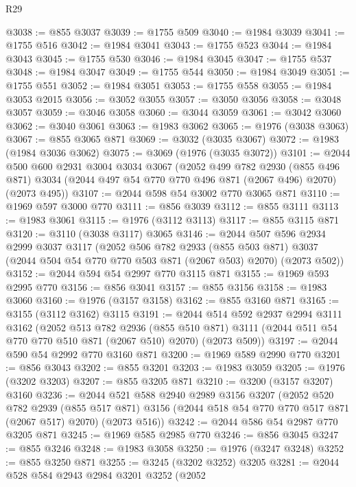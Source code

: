 \begin{lexlean}{R29}
\begin{coremodule}
@3038 := @855 @3037
@3039 := @1755 @509
@3040 := @1984 @3039
@3041 := @1755 @516
@3042 := @1984 @3041
@3043 := @1755 @523
@3044 := @1984 @3043
@3045 := @1755 @530
@3046 := @1984 @3045
@3047 := @1755 @537
@3048 := @1984 @3047
@3049 := @1755 @544
@3050 := @1984 @3049
@3051 := @1755 @551
@3052 := @1984 @3051
@3053 := @1755 @558
@3055 := @1984 @3053 @2015
@3056 := @3052 @3055
@3057 := @3050 @3056
@3058 := @3048 @3057
@3059 := @3046 @3058
@3060 := @3044 @3059
@3061 := @3042 @3060
@3062 := @3040 @3061
@3063 := @1983 @3062
@3065 := @1976 (@3038 @3063)
@3067 := @855 @3065 @871
@3069 := @3032 (@3035 @3067)
@3072 := @1983 (@1984 @3036 @3062)
@3075 := @3069 (@1976 (@3035 @3072))
@3101 := @2044
    @500
    @600
    @2931
    @3004
    @3034
    @3067
    (@2052
      @499
      @782
      @2930
      (@855 @496 @871)
      @3034
      (@2044 @497 @54 @770 @770 @496 @871 (@2067 @496) @2070)
      (@2073 @495))
@3107 := @2044 @598 @54 @3002 @770 @3065 @871
@3110 := @1969 @597 @3000 @770
@3111 := @856 @3039
@3112 := @855 @3111
@3113 := @1983 @3061
@3115 := @1976 (@3112 @3113)
@3117 := @855 @3115 @871
@3120 := @3110 (@3038 @3117) @3065
@3146 := @2044
    @507
    @596
    @2934
    @2999
    @3037
    @3117
    (@2052
      @506
      @782
      @2933
      (@855 @503 @871)
      @3037
      (@2044 @504 @54 @770 @770 @503 @871 (@2067 @503) @2070)
      (@2073 @502))
@3152 := @2044 @594 @54 @2997 @770 @3115 @871
@3155 := @1969 @593 @2995 @770
@3156 := @856 @3041
@3157 := @855 @3156
@3158 := @1983 @3060
@3160 := @1976 (@3157 @3158)
@3162 := @855 @3160 @871
@3165 := @3155 (@3112 @3162) @3115
@3191 := @2044
    @514
    @592
    @2937
    @2994
    @3111
    @3162
    (@2052
      @513
      @782
      @2936
      (@855 @510 @871)
      @3111
      (@2044 @511 @54 @770 @770 @510 @871 (@2067 @510) @2070)
      (@2073 @509))
@3197 := @2044 @590 @54 @2992 @770 @3160 @871
@3200 := @1969 @589 @2990 @770
@3201 := @856 @3043
@3202 := @855 @3201
@3203 := @1983 @3059
@3205 := @1976 (@3202 @3203)
@3207 := @855 @3205 @871
@3210 := @3200 (@3157 @3207) @3160
@3236 := @2044
    @521
    @588
    @2940
    @2989
    @3156
    @3207
    (@2052
      @520
      @782
      @2939
      (@855 @517 @871)
      @3156
      (@2044 @518 @54 @770 @770 @517 @871 (@2067 @517) @2070)
      (@2073 @516))
@3242 := @2044 @586 @54 @2987 @770 @3205 @871
@3245 := @1969 @585 @2985 @770
@3246 := @856 @3045
@3247 := @855 @3246
@3248 := @1983 @3058
@3250 := @1976 (@3247 @3248)
@3252 := @855 @3250 @871
@3255 := @3245 (@3202 @3252) @3205
@3281 := @2044
    @528
    @584
    @2943
    @2984
    @3201
    @3252
    (@2052

\end{coremodule}
\end{lexlean}
